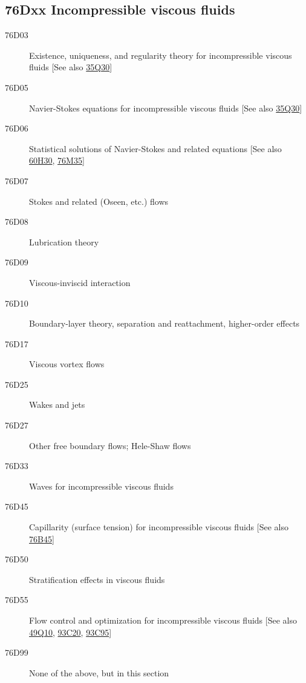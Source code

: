 \subsection*{76Dxx  Incompressible viscous fluids }\label{76Dxx}
\begin{description}  
\item [76D03]\label{76D03} Existence, uniqueness, and regularity theory for incompressible viscous fluids [See also \hyperref[35Q30]{35Q30}]
\item [76D05]\label{76D05} Navier-Stokes equations for incompressible viscous fluids [See also \hyperref[35Q30]{35Q30}]
\item [76D06]\label{76D06} Statistical solutions of Navier-Stokes and related equations [See also \hyperref[60H30]{60H30}, \hyperref[76M35]{76M35}]
\item [76D07]\label{76D07} Stokes and related (Oseen, etc.) flows
\item [76D08]\label{76D08} Lubrication theory
\item [76D09]\label{76D09} Viscous-inviscid interaction
\item [76D10]\label{76D10} Boundary-layer theory, separation and reattachment, higher-order effects
\item [76D17]\label{76D17} Viscous vortex flows
\item [76D25]\label{76D25} Wakes and jets
\item [76D27]\label{76D27} Other free boundary flows; Hele-Shaw flows
\item [76D33]\label{76D33} Waves for incompressible viscous fluids
\item [76D45]\label{76D45} Capillarity (surface tension) for incompressible viscous fluids [See also \hyperref[76B45]{76B45}]
\item [76D50]\label{76D50} Stratification effects in viscous fluids
\item [76D55]\label{76D55} Flow control and optimization for incompressible viscous fluids [See also \hyperref[49Q10]{49Q10}, \hyperref[93C20]{93C20}, \hyperref[93C95]{93C95}]
\item [76D99]\label{76D99} None of the above, but in this section
\end{description}
